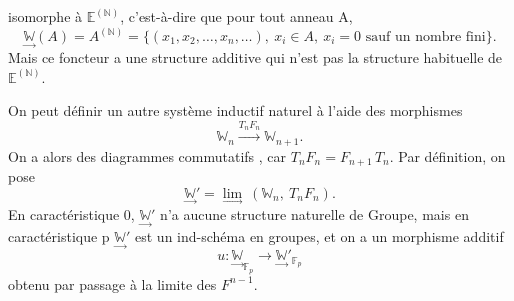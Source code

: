 isomorphe à  $\mathbb{E}^{(\mathbb{N})}$, c'est-à-dire que pour tout anneau  A,
\[ \underset{\rightarrow}{\mathbb{W}}(A) = A^{(\mathbb{N})} = \{(x_1,x_2,\ldots,x_n,\ldots),\ x_i \in A,\ x_i = 0 \text{ sauf un nombre fini}\}. \]
Mais ce foncteur a une structure additive qui n'est pas la structure
habituelle de $\mathbb{E}^{(\mathbb{N})}$.

On peut définir un autre système inductif naturel à l'aide des
morphismes
\[ \mathbb{W}_n \xrightarrow{T_n F_n} \mathbb{W}_{n+1} . \]
On a alors des diagrammes commutatifs
 ,
car  $T_nF_n = F_{n+1}\,T_n$.  Par définition, on pose
\[ \underset{\rightarrow}{\mathbb{W}}' = \underset{\rightarrow}{\lim}\ (\mathbb{W}_n,\ T_nF_n). \]
En caractéristique  0, $\underset{\rightarrow}{\mathbb{W}}'$  n'a aucune structure naturelle de Groupe,
mais en caractéristique p $\underset{\rightarrow}{\mathbb{W}}'$ est un ind-schéma en groupes, et on a un
morphisme additif
\[ u\colon \underset{\rightarrow}{\mathbb{W}}_{\mathbb{F}_p} \to \underset{\rightarrow}{\mathbb{W}}'_{\mathbb{F}_p} \]
obtenu par passage à la limite des  $F^{n-1}$.

